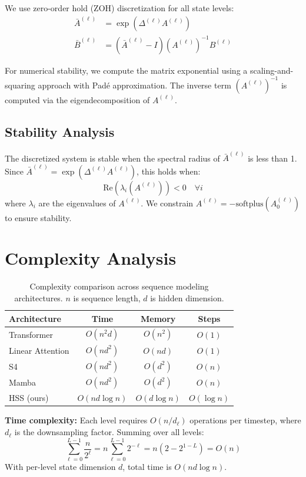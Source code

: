 \documentclass[10pt,twocolumn]{IEEEtran}
\begin{document}
We use zero-order hold (ZOH) discretization for all state levels:
\begin{align}
\bar{A}^{(\ell)} &= \exp(\Delta^{(\ell)} A^{(\ell)}) \\
\bar{B}^{(\ell)} &= (\bar{A}^{(\ell)} - I) (A^{(\ell)})^{-1} B^{(\ell)}
\end{align}

For numerical stability, we compute the matrix exponential using a
scaling-and-squaring approach with Pad\'{e} approximation. The
inverse term $(A^{(\ell)})^{-1}$ is computed via the eigendecomposition
of $A^{(\ell)}$.

\subsection{Stability Analysis}

The discretized system is stable when the spectral radius of
$\bar{A}^{(\ell)}$ is less than 1. Since $\bar{A}^{(\ell)} =
\exp(\Delta^{(\ell)} A^{(\ell)})$, this holds when:
\begin{equation}
\text{Re}(\lambda_i(A^{(\ell)})) < 0 \quad \forall i
\end{equation}
where $\lambda_i$ are the eigenvalues of $A^{(\ell)}$. We
constrain $A^{(\ell)} = -\text{softplus}(A_0^{(\ell)})$ to
ensure stability.

\section{Complexity Analysis}

\begin{table}[ht]
\centering
\caption{Complexity comparison across sequence modeling architectures.
$n$ is sequence length, $d$ is hidden dimension.}
\label{tab:complexity}
\begin{tabular}{lccc}
\toprule
Architecture & Time & Memory & Steps \\
\midrule
Transformer & $O(n^2 d)$ & $O(n^2)$ & $O(1)$ \\
Linear Attention & $O(n d^2)$ & $O(n d)$ & $O(1)$ \\
S4 & $O(n d^2)$ & $O(d^2)$ & $O(n)$ \\
Mamba & $O(n d^2)$ & $O(d^2)$ & $O(n)$ \\
HSS (ours) & $O(n d \log n)$ & $O(d \log n)$ & $O(\log n)$ \\
\bottomrule
\end{tabular}
\end{table}

\textbf{Time complexity:} Each level requires $O(n/d_\ell)$ operations
per timestep, where $d_\ell$ is the downsampling factor. Summing
over all levels:
\begin{equation}
\sum_{\ell=0}^{L-1} \frac{n}{2^\ell} = n \sum_{\ell=0}^{L-1} 2^{-\ell} = n(2 - 2^{1-L}) = O(n)
\end{equation}
With per-level state dimension $d$, total time is $O(n d \log n)$.
\end{document}
